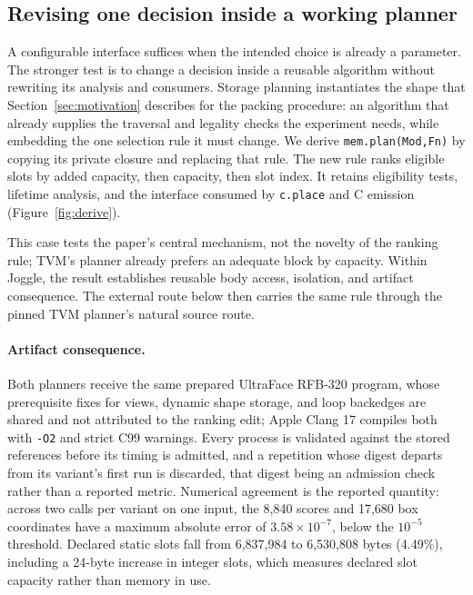 \documentclass[sigplan,anonymous,review]{acmart}
\begin{document}
\subsection{Revising one decision inside a working planner}
\label{sec:eval-derive}
A configurable interface suffices when the intended choice is already a
parameter. The stronger test is to change a decision inside a reusable
algorithm without rewriting its analysis and consumers. Storage planning
instantiates the shape that Section~\ref{sec:motivation} describes for the
packing procedure: an algorithm that already supplies the traversal and
legality checks the experiment needs, while embedding the one selection rule it
must change. We derive \texttt{mem.plan(Mod,Fn)} by copying its private closure
and replacing that rule. The new rule ranks eligible slots by added capacity,
then capacity, then slot index. It retains eligibility tests, lifetime
analysis, and the interface consumed by \texttt{c.place} and C emission
(Figure~\ref{fig:derive}).

This case tests the paper's central mechanism, not the novelty of the ranking
rule; TVM's planner already prefers an adequate block by capacity. Within
Joggle, the result establishes reusable body access, isolation, and artifact
consequence. The external route below then carries the same rule through the
pinned TVM planner's natural source route.

\paragraph{Artifact consequence.}
Both planners receive the same prepared UltraFace RFB-320 program, whose
prerequisite fixes for views, dynamic shape storage, and loop backedges are
shared and not attributed to the ranking edit; Apple Clang 17 compiles both with
\texttt{-O2} and strict C99 warnings. Every process is validated against the
stored references before its timing is admitted, and a repetition whose digest
departs from its variant's first run is discarded, that digest being an admission
check rather than a reported metric. Numerical agreement is the reported
quantity: across two calls per variant on one input, the 8,840 scores and 17,680
box coordinates have a maximum absolute error of $3.58\times10^{-7}$, below the
$10^{-5}$ threshold. Declared static slots fall from 6,837,984 to 6,530,808 bytes
(4.49\%), including a 24-byte increase in integer slots, which measures declared
slot capacity rather than memory in use.
\end{document}
